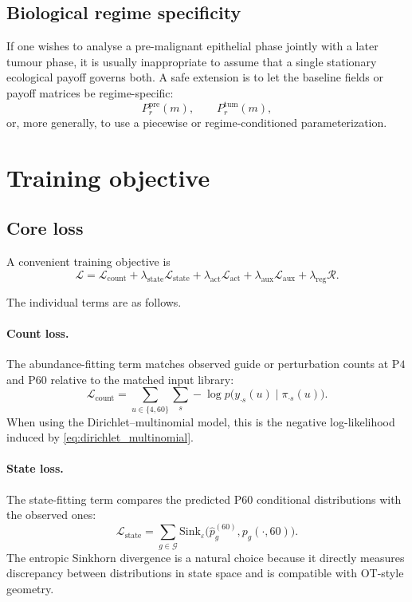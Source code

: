 \documentclass[11pt]{article}
\newcommand{\G}{\mathcal{G}}
\newcommand{\1}{\mathbf{1}}
\newcommand{\Pfour}{\mathrm{P4}}
\newcommand{\Psixty}{\mathrm{P60}}
\newcommand{\Sink}{\mathrm{Sink}_{\varepsilon}}
\theoremstyle{plain}
\begin{document}
\subsection{Biological regime specificity}

If one wishes to analyse a pre-malignant epithelial phase jointly with a later tumour phase, it is usually inappropriate to assume that a single stationary ecological payoff governs both. A safe extension is to let the baseline fields or payoff matrices be regime-specific:
\begin{equation}
P_r^{\mathrm{pre}}(m),\qquad P_r^{\mathrm{tum}}(m),
\label{eq:regime_specific}
\end{equation}
or, more generally, to use a piecewise or regime-conditioned parameterization.

\section{Training objective}

\subsection{Core loss}

A convenient training objective is
\begin{equation}
\mathcal L
=
\mathcal L_{\mathrm{count}}
+\lambda_{\mathrm{state}}\mathcal L_{\mathrm{state}}
+\lambda_{\mathrm{act}}\mathcal L_{\mathrm{act}}
+\lambda_{\mathrm{aux}}\mathcal L_{\mathrm{aux}}
+\lambda_{\mathrm{reg}}\mathcal R.
\label{eq:total_loss}
\end{equation}

The individual terms are as follows.

\paragraph{Count loss.}
The abundance-fitting term matches observed guide or perturbation counts at $\Pfour$ and $\Psixty$ relative to the matched input library:
\begin{equation}
\mathcal L_{\mathrm{count}}
=
\sum_{u\in\{4,60\}}\sum_s
-\log p\big(y_{\cdot s}(u)\mid \pi_{\cdot s}(u)\big).
\label{eq:count_loss}
\end{equation}
When using the Dirichlet--multinomial model, this is the negative log-likelihood induced by \eqref{eq:dirichlet_multinomial}.

\paragraph{State loss.}
The state-fitting term compares the predicted $\Psixty$ conditional distributions with the observed ones:
\begin{equation}
\mathcal L_{\mathrm{state}}
=
\sum_{g\in\G}
\Sink\big(\widehat p_g^{(60)},p_g(\cdot,60)\big).
\label{eq:state_loss}
\end{equation}
The entropic Sinkhorn divergence is a natural choice because it directly measures discrepancy between distributions in state space and is compatible with OT-style geometry.
\end{document}
